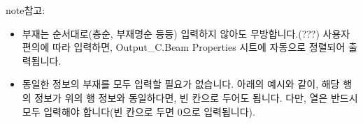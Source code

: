 \documentclass[a4paper,11pt,korean,openany,oneside]{sphinxmanual}
\begin{document}
\begin{sphinxadmonition}{note}{참고:}\begin{itemize}
\item {} 
\sphinxAtStartPar
부재는 순서대로(층순, 부재명순 등등) 입력하지 않아도 무방합니다.(???)
사용자 편의에 따라 입력하면, Output\_C.Beam Properties 시트에 자동으로 정렬되어 출력됩니다.

\item {} 
\sphinxAtStartPar
동일한 정보의 부재를 모두 입력할 필요가 없습니다. 아래의 예시와 같이, 해당 행의 정보가 위의 행 정보와 동일하다면, 빈 칸으로 두어도 됩니다.
다만,  열은 반드시 모두 입력해야 합니다(빈 칸으로 두면 0으로 입력됩니다).

\begin{figure}[H]
\centering

\noindent{}
\end{figure}

\end{itemize}
\end{sphinxadmonition}
\end{document}
